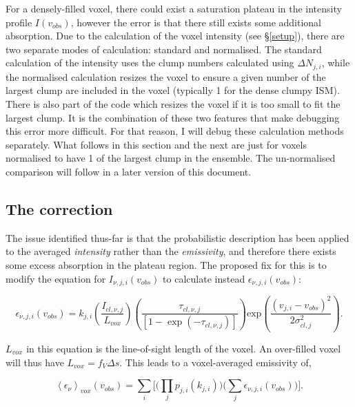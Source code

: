 \documentclass[a4paper]{article}
\begin{document}
    For a densely-filled voxel, there could exist a saturation plateau in the intensity profile \(I(v_{obs})\), however the error is that there still exists some additional absorption.
    Due to the calculation of the voxel intensity (see \S \ref{setup}), there are two separate modes of calculation: standard and normalised.
    The standard calculation of the intensity uses the clump numbers calculated using \(\Delta N_{j,i}\), while the normalised calculation resizes the voxel to ensure a given number of the largest clump are included in the voxel (typically 1 for the dense clumpy ISM).
    There is also part of the code which resizes the voxel if it is too small to fit the largest clump.
    It is the combination of these two features that make debugging this error more difficult.
    For that reason, I will debug these calculation methods separately.
    What follows in this section and the next are just for voxels normalised to have 1 of the largest clump in the ensemble.
    The un-normalised comparison will follow in a later version of this document.

    \subsection{The correction}

    The issue identified thus-far is that the probabilistic description has been applied to the averaged \textit{intensity} rather than the \textit{emissivity}, and therefore there exists some excess absorption in the plateau region.
    The proposed fix for this is to modify the equation for \(I_{\nu, j, i} (v_{obs})\) to calculate instead \(\epsilon_{\nu, j, i} (v_{obs})\):

    \begin{equation}
    \label{corrected emissivity}
    \epsilon_{\nu,j,i} (v_{obs}) = k_{j,i} \left( \frac{I_{cl,\nu,j}}{L_{vox}} \right) \left(\frac{\tau_{cl,\nu,j}}{\left[ 1 - \exp(- \tau_{cl,\nu,j}) \right]} \right) \mathrm{exp} \left( \frac{(v_{j,i}-v_{obs})^2}{2\sigma_{cl,j}^2} \right).
    \end{equation}

    \(L_{vox}\) in this equation is the line-of-sight length of the voxel. An over-filled voxel will thus have \(L_{vox} = f_V \Delta s\). This leads to a voxel-averaged emissivity of,

    \begin{equation}
    \label{corrected voxel-averaged emissivity}
    \left< \epsilon_\nu \right>_{vox} (v_{obs}) = \sum_i \bigg[ \Big( \prod_j p_{j,i}(k_{j,i}) \Big) \Big( \sum_j \epsilon_{\nu,j,i} (v_{obs}) \Big) \bigg].
    \end{equation}
\end{document}
